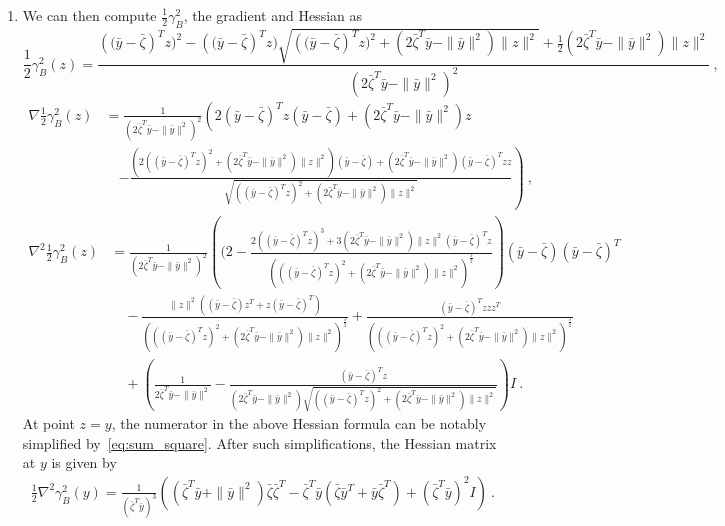\documentclass[sn-mathphys,Numbered]{sn-jnl}%
\begin{document}
\begin{appendices}
{\begin{enumerate}[label=(\alph*)]
\item We can then compute $\frac{1}{2}\gamma^2_B$, the gradient and Hessian as
$$\frac{1}{2}\gamma_B^2(z)=\frac{\left((\bar y -\bar \zeta\right)^Tz)^2-\left((\bar y -\bar \zeta\right)^Tz)\sqrt{\left((\bar y -\bar \zeta\right)^Tz)^2+(2\bar \zeta^T \bar y -\|\bar y\|^2)\|z\|^2}+ \frac{1}{2}(2\bar \zeta^T \bar y -\|\bar y\|^2)\|z\|^2}{(2\bar \zeta^T \bar y -\|\bar y\|^2)^2 } \ ,
$$
\begin{align*}
    \nabla \frac{1}{2}\gamma_B^2(z) &= \frac{1}{(2\bar \zeta^T \bar y -\|\bar y\|^2)^2 }\left(2(\bar y-\bar \zeta)^Tz(\bar y - \bar \zeta)+(2\bar \zeta^T \bar y-\|\bar y\|^2)z \right. \\
    & \quad \left.-\frac{\left(2\left((\bar y- \bar \zeta)^Tz\right)^2+(2\bar \zeta^T \bar y-\|\bar y\|^2)\|z\|^2\right)(\bar y-\bar \zeta)+(2\bar  \zeta^T\bar y - \|\bar y\|^2)(\bar y -\bar \zeta)^Tz z}{\sqrt{\left((\bar y -\bar \zeta)^Tz\right)^2+(2\bar \zeta^T \bar y -\|\bar y\|^2)\|z\|^2}}\right) \ ,
\end{align*}
\begin{align*}
    \nabla^2 \frac{1}{2}\gamma_B^2(z) &= \frac{1}{(2\bar \zeta^T \bar y -\|\bar y\|^2)^2 }\left((2-\frac{2\left((\bar y -\bar \zeta)^Tz\right)^3+3(2\bar \zeta^T\bar y- \|\bar y\|^2)\|z\|^2(\bar y -\bar \zeta)^Tz}{\left(\left((\bar y -\bar \zeta)^Tz\right)^2+(2\bar \zeta^T \bar y -\|\bar y\|^2)\|z\|^2\right)^\frac{3}{2}}\right)(\bar y-\bar \zeta)(\bar y - \bar \zeta)^T  \\
    & \quad -\frac{\|z\|^2\left((\bar y -\bar \zeta)z^T+z(\bar y-\bar \zeta)^T\right)}{\left(\left((\bar y -\bar \zeta)^Tz\right)^2+(2\bar \zeta^T \bar y -\|\bar y\|^2)\|z\|^2\right)^\frac{3}{2}}+\frac{(\bar y- \bar \zeta)^Tz zz^T}{\left(\left((\bar y -\bar \zeta)^Tz\right)^2+(2\bar \zeta^T \bar y -\|\bar y\|^2)\|z\|^2\right)^\frac{3}{2}} \\
    & \quad +\left(\frac{1}{2\bar \zeta^T \bar y -\|\bar y\|^2}-\frac{(\bar y- \bar \zeta)^Tz}{(2\bar \zeta^T \bar y -\|\bar y\|^2)\sqrt{\left((\bar y -\bar \zeta)^Tz\right)^2+(2\bar \zeta^T \bar y -\|\bar y\|^2)\|z\|^2}}\right)I \ .
\end{align*}
At point $z=y$, the numerator in the above Hessian formula can be notably simplified by~\eqref{eq:sum_square}. After such simplifications, the Hessian matrix at $y$ is given by 
\begin{align*}
    \frac{1}{2}\nabla^2 \gamma_B^2(y) = \frac{1}{\left(\bar \zeta^T \bar{y}\right)^3}\left(\left(\bar \zeta^T \bar{y}+\|\bar{y}\|^2\right)\bar\zeta\bar\zeta^T-\bar \zeta^T \bar{y}(\bar\zeta\bar{y}^T+\bar{y}\bar\zeta^T)+\left(\bar \zeta^T \bar{y}\right)^2I \right) \ .
\end{align*}
\end{enumerate}




}
\end{appendices}
\end{document}
